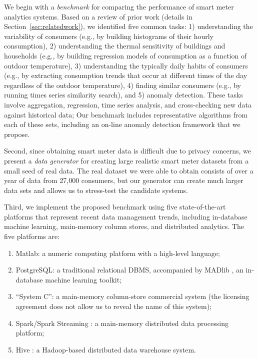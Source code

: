 \documentclass[prodmode,acmtods]{acmsmall}
\begin{document}
We begin with a \emph{benchmark} for comparing the performance of smart meter analytics systems.  Based on a review of prior work (details in Section~\ref{sec:relatedwork}), we identified five common tasks: 1) understanding the variability of consumers (e.g., by building histograms of their hourly consumption), 2) understanding the thermal sensitivity of buildings and households (e.g., by building regression models of consumption as a function of outdoor temperature), 3) understanding the typically daily habits of consumers (e.g., by extracting consumption trends that occur at different times of the day regardless of the outdoor temperature), 4) finding similar consumers (e.g., by running times series similarity search), and 5) anomaly detection.  These tasks involve aggregation, regression, time series analysis, and cross-checking new data against historical data;   
Our benchmark includes representative algorithms from each of these sets, including an on-line anomaly detection framework that we propose.

Second, since obtaining smart meter data is difficult due to privacy concerns, we present a \emph{data generator} for creating large realistic smart meter datasets from a small seed of real data.   The real dataset we were able to obtain consists of over a year of data from 27,000 consumers, but our generator can create much larger data sets and allows us to stress-test the candidate systems.

Third, we implement the proposed benchmark using five state-of-the-art platforms that represent recent data management trends, including in-database machine learning, main-memory column stores, and distributed analytics.  The five platforms are:

\begin{enumerate}
\item Matlab: a numeric computing platform with a high-level language;
\item PostgreSQL: a traditional relational DBMS, accompanied by MADlib \cite{madlibpaper}, an in-database machine learning toolkit;
\item ``System C'': a main-memory column-store commercial system (the licensing agreement does not allow us to reveal the name of this system);
\item Spark/Spark Streaming \cite{zaharia2010,zdl+12}: a main-memory distributed data processing platform;
\item Hive \cite{hive}: a Hadoop-based distributed data warehouse system.
\end{enumerate}  
\end{document}
